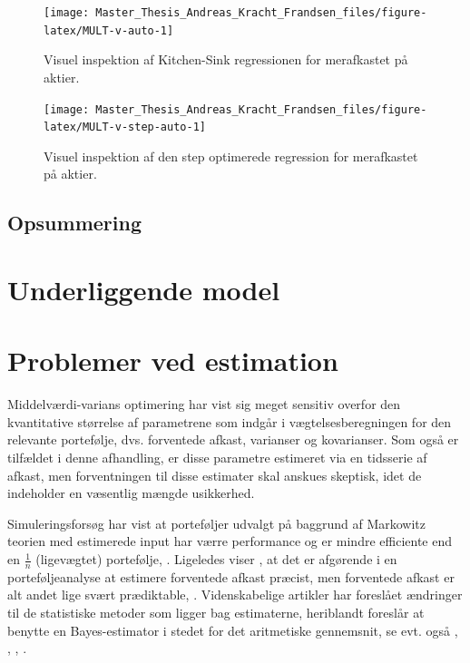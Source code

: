 \documentclass[
  a4paper,
  oneside]{memoir}
\begin{document}
\begin{table}[H]
\begin{threeparttable}
\begin{tablenotes}
\end{tablenotes}
\end{threeparttable}
\end{table}

\begin{figure}[H]

{\centering \texttt{[image: Master\_Thesis\_Andreas\_Kracht\_Frandsen\_files/figure-latex/MULT-v-auto-1]} 

}

\caption{Visuel inspektion af Kitchen-Sink regressionen for merafkastet på aktier.}\label{fig:MULT-v-auto}
\end{figure}

\begin{figure}[H]

{\centering \texttt{[image: Master\_Thesis\_Andreas\_Kracht\_Frandsen\_files/figure-latex/MULT-v-step-auto-1]} 

}

\caption{Visuel inspektion af den step optimerede regression for merafkastet på aktier.}\label{fig:MULT-v-step-auto}
\end{figure}

\hypertarget{opsreg}{%
\section{Opsummering}\label{opsreg}}

\hypertarget{underliggende-model}{%
\chapter{Underliggende model}\label{underliggende-model}}

\hypertarget{problemer-ved-estimation}{%
\chapter{Problemer ved estimation}\label{problemer-ved-estimation}}

Middelværdi-varians optimering har vist sig meget sensitiv overfor den kvantitative størrelse af parametrene som indgår i vægtelsesberegningen for den relevante portefølje, dvs. forventede afkast, varianser og kovarianser. Som også er tilfældet i denne afhandling, er disse parametre estimeret via en tidsserie af afkast, men forventningen til disse estimater skal anskues skeptisk, idet de indeholder en væsentlig mængde usikkerhed.

Simuleringsforsøg har vist at porteføljer udvalgt på baggrund af Markowitz teorien med estimerede input har værre performance og er mindre efficiente end en \(\tfrac{1}{n}\) (ligevægtet) portefølje, \citep{Frankfurter1971}. Ligeledes viser \citep{Chopra1993}, at det er afgørende i en porteføljeanalyse at estimere forventede afkast præcist, men forventede afkast er alt andet lige svært prædiktable, \citep{Merton1980}. Videnskabelige artikler har foreslået ændringer til de statistiske metoder som ligger bag estimaterne, heriblandt foreslår \citep{Jorion1986} at benytte en Bayes-estimator i stedet for det aritmetiske gennemsnit, se evt. også \citep{MacKinlay2000}, \citep{Garlappi2007}, \citep{Kan2007}, \citep{Tu2011}.
\end{document}
